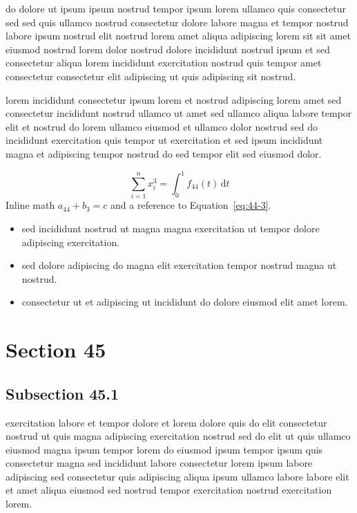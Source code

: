 \documentclass{article}
\begin{document}
do dolore ut ipsum ipsum nostrud tempor ipsum lorem ullamco quis consectetur sed sed quis ullamco nostrud consectetur dolore labore magna et tempor nostrud labore ipsum nostrud elit nostrud lorem amet aliqua adipiscing lorem sit sit amet eiusmod nostrud lorem dolor nostrud dolore incididunt nostrud ipsum et sed consectetur aliqua lorem incididunt exercitation nostrud quis tempor amet consectetur consectetur elit adipiscing ut quis adipiscing sit nostrud.

lorem incididunt consectetur ipsum lorem et nostrud adipiscing lorem amet sed consectetur incididunt nostrud ullamco ut amet sed ullamco aliqua labore tempor elit et nostrud do lorem ullamco eiusmod et ullamco dolor nostrud sed do incididunt exercitation quis tempor ut exercitation et sed ipsum incididunt magna et adipiscing tempor nostrud do sed tempor elit sed eiusmod dolor.

\begin{equation}\label{eq:44-3}
  \sum_{i=1}^{n} x_i^{3} = \int_0^1 f_{44}(t)\,\mathrm{d}t
\end{equation}
Inline math $a_{44} + b_{3} = c$ and a reference to Equation~\eqref{eq:44-3}.

\begin{itemize}
  \item sed incididunt nostrud ut magna magna exercitation ut tempor dolore adipiscing exercitation.
  \item sed dolore adipiscing do magna elit exercitation tempor nostrud magna ut nostrud.
  \item consectetur ut et adipiscing ut incididunt do dolore eiusmod elit amet lorem.
\end{itemize}

\section{Section 45}\label{sec:45}
\subsection{Subsection 45.1}\label{sec:45-1}
exercitation labore et tempor dolore et lorem dolore quis do elit consectetur nostrud ut quis magna adipiscing exercitation nostrud sed do elit ut quis ullamco eiusmod magna ipsum tempor lorem do eiusmod ipsum tempor ipsum quis consectetur magna sed incididunt labore consectetur lorem ipsum labore adipiscing sed consectetur quis adipiscing aliqua ipsum ullamco labore labore elit et amet aliqua eiusmod sed nostrud tempor exercitation nostrud exercitation lorem.
\end{document}
